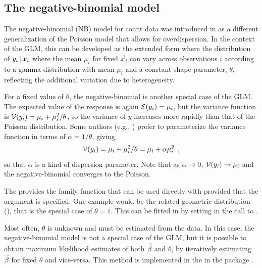 \documentclass[11pt]{book}\usepackage[]{graphicx}\usepackage[]{color}
\begin{document}
\subsection{The negative-binomial model}\label{sec:glm-negbin}

The negative-binomial (NB) model for count data was introduced in 
as a different generalization of the Poisson model that allows for overdispersion. 
In the context of the GLM, this can be developed as the extended form where
the distribution of $y_i \, | \, \bm{x}_i$ where the mean $\mu_i$ for fixed
$\vec{x}_i$ can vary across observations $i$ according to a gamma distribution 
with mean $\mu_i$ and a constant shape parameter, $\theta$, reflecting the
additional variation due to heterogeneity.

For a fixed value of $\theta$, the negative-binomial is another special case of
the GLM.
The expected value of the response is again
$\mathcal{E}(y_i) = \mu_i$, but the variance function is $\mathcal{V}(y_i) = \mu_i + \mu_i^2 / \theta$,
so the variance of $y$ increases more rapidly than that of the Poisson distribution.
Some authors (e.g., \citet{Agresti:2013,Hilbe:2014}) prefer to parameterize the variance
function in terms of $\alpha = 1/\theta$, giving
\begin{equation*}
\mathcal{V}(y_i) = \mu_i + \mu_i^2 / \theta = \mu_i + \alpha \mu_i^2 \:\: ,
\end{equation*}
so that $\alpha$ is a kind of dispersion parameter.  Note that as $\alpha \rightarrow 0$,
$\mathcal{V}(y_i) \rightarrow \mu_i$ and the negative-binomial converges to the Poisson.

The  provides the family function  that
can be used directly with  provided that the argument  is specified.
One example would be the related geometric distribution (),
that is the special case of $\theta=1$. This can be fitted in \R by setting
 in the call to .

Most often, $\theta$ is unknown and must be estimated from the data.
In this case, the negative-binomial model is not a special case of the GLM, 
but it is possible to obtain maximum likelihood estimates of both
$\vec{\beta}$ and $\theta$, by iteratively estimating $\vec{\beta}$ for fixed $\theta$
and vice-versa. This method is implemented in the  in the package .
\end{document}
